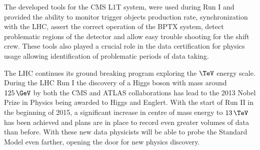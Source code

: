 The developed tools for the \gls{CMS} \gls{L1T} system, were used during Run I and provided the ability to monitor trigger objects production rate, synchronization with the \gls{LHC}, assert the correct operation of the \gls{BPTX} system, detect problematic regions of the detector and allow easy trouble shooting for the shift crew. These tools also played a crucial role in the data certification for physics usage allowing identification of problematic periods of data taking.

The \gls{LHC} continues its ground breaking program exploring the $\TeV$ energy scale. During the \gls{LHC} Run I the discovery of a Higgs boson with mass around $125\,\GeV$ by both the CMS and ATLAS collaborations has lead to the 2013 Nobel Prize in Physics being awarded to Higgs and Englert. With the start of Run II in the beginning of 2015, a significant increase in centre of mass energy to $13\,\TeV$ has been achieved and plans are in place to record even greater volumes of data than before. With these new data physicists will be able to probe the Standard Model even farther, opening the door for new physics discovery.

